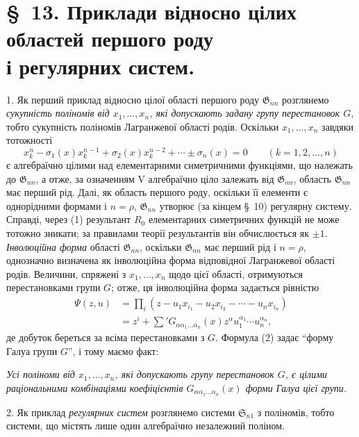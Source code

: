 \documentclass[11pt]{article}
\providecommand{\Ssys}{\mathfrak{S}}
\providecommand{\Gdom}{\mathfrak{G}}
\begin{document}
\section*{\S\ 13. Приклади відносно цілих областей першого роду\\ і регулярних систем.}

1. Як перший приклад відносно цілої області першого роду $\Gdom_{nn}$ розглянемо \emph{сукупність поліномів від $x_1,\ldots,x_n$, які допускають задану групу перестановок $G$}, тобто сукупність поліномів Лагранжевої області родів. Оскільки $x_1,\ldots,x_n$ завдяки тотожності
\begin{equation}
  x_k^n-\sigma_1(x)x_k^{n-1}+\sigma_2(x)x_k^{n-2}+\cdots\pm\sigma_n(x)=0
  \qquad(k=1,2,\ldots,n)
\tag{1}
\end{equation}
є алгебраїчно цілими над елементарними симетричними функціями, що належать до $\Gdom_{nn}$, а отже, за означенням V алгебраїчно ціло залежать від $\Gdom_{nn}$, область $\Gdom_{nn}$ має перший рід. Далі, як область першого роду, оскільки її елементи є однорідними формами і $n=\rho$, $\Gdom_{nn}$ утворює (за кінцем \S\ 10) регулярну систему. Справді, через (1) результант $R_0$ елементарних симетричних функцій не може тотожно зникати; за правилами теорії результантів він обчислюється як $\pm1$. \emph{Інволюційна форма} області $\Gdom_{nn}$, оскільки $\Gdom_{nn}$ має перший рід і $n=\rho$, однозначно визначена як інволюційна форма відповідної Лагранжевої області родів. Величини, спряжені з $x_1,\ldots,x_n$ щодо цієї області, отримуються перестановками групи $G$; отже, ця інволюційна форма задається рівністю
\begin{equation}
\begin{aligned}
  \Psi(z,u)&=\prod_i
  (z-u_1x_{i_1}-u_2x_{i_2}-\cdots-u_nx_{i_n})\\
  &=z^i+\sum{}'G_{\alpha\alpha_1\ldots\alpha_n}(x)
  z^\alpha u_1^{\alpha_1}\cdots u_n^{\alpha_n},
\end{aligned}
\tag{2}
\end{equation}
де добуток береться за всіма перестановками з $G$. Формула (2) задає ``форму Галуа групи $G$'', і тому маємо факт:

\emph{Усі поліноми від $x_1,\ldots,x_n$, які допускають групу перестановок $G$, є цілими раціональними комбінаціями коефіцієнтів $G_{\alpha\alpha_1\ldots\alpha_n}(x)$ форми Галуа цієї групи.}

2. Як приклад \emph{регулярних систем} розглянемо системи $\Ssys_{n1}$ з поліномів, тобто системи, що містять лише один алгебраїчно незалежний поліном.
\end{document}
